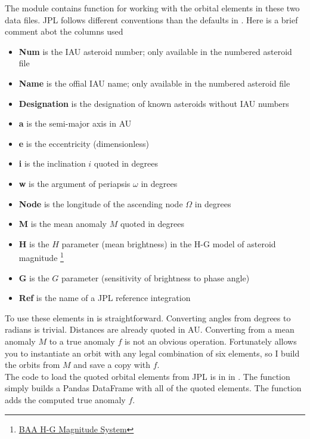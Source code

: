 The module  contains function for working with the orbital elements in these two data files.
JPL follows different conventions than the defaults in .
Here is a brief comment abot the columns used
\begin{itemize}
\item \textbf{Num} is the IAU asteroid number; only available in the numbered asteroid file
\item \textbf{Name} is the offial IAU name; only available in the numbered asteroid file
\item \textbf{Designation} is the designation of known asteroids without IAU numbers
\item \textbf{a} is the semi-major axis in AU
\item \textbf{e} is the eccentricity (dimensionless)
\item \textbf{i} is the inclination $i$ quoted in degrees
\item \textbf{w} is the argument of periapsis $\omega$ in degrees
\item \textbf{Node} is the longitude of the ascending node $\Omega$ in degrees
\item \textbf{M} is the mean anomaly $M$ quoted in degrees
\item \textbf{H} is the $H$ parameter (mean brightness) in the H-G model of asteroid magnitude 
\footnote{\href{https://www.britastro.org/asteroids/dymock4.pdf}{BAA H-G Magnitude System} }
\item \textbf{G} is the $G$ parameter (sensitivity of brightness to phase angle)
\item \textbf{Ref} is the name of a JPL reference integration
\end{itemize}
To use these elements in  is straightforward.
Converting angles from degrees to radians is trivial.
Distances are already quoted in AU.
Converting from a mean anomaly $M$ to a true anomaly $f$ is not an obvious operation.
Fortunately  allows you to instantiate an orbit with any legal combination of six elements,
so I build the orbits from $M$ and save a copy with $f$. \\
The code to load the quoted orbital elements from JPL is in  in .
The function  simply builds a Pandas DataFrame with all of the quoted elements.
The function  adds the computed true anomaly $f$.

